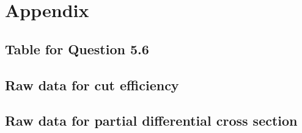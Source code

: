 \clearpage
\appendix
\section{Appendix}
\subsection{Table for Question 5.6}
	

\clearpage
\subsection{Raw data for cut efficiency}\label{app:59}


\clearpage
\subsection{Raw data for partial differential cross section}\label{app:510}

